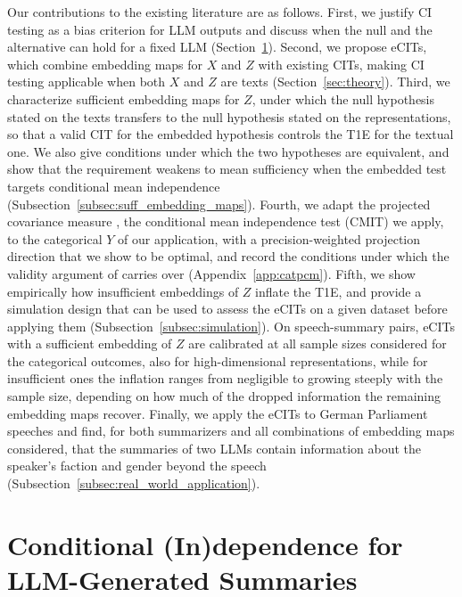 \documentclass[twoside,11pt]{article}
\begin{document}
Our contributions to the existing literature are as follows.
First, we justify CI testing as a bias criterion for LLM outputs and discuss when the null and the alternative can hold for a fixed LLM (Section~\ref{sec:motivation_llm_summaries}).
Second, we propose eCITs, which combine embedding maps for $X$ and $Z$ with existing CITs, making CI testing applicable when both $X$ and $Z$ are texts (Section~\ref{sec:theory}).
Third, we characterize sufficient embedding maps for $Z$, under which the null hypothesis stated on the texts transfers to the null hypothesis stated on the representations, so that a valid CIT for the embedded hypothesis controls the T1E for the textual one. We also give conditions under which the two hypotheses are equivalent, and show that the requirement weakens to mean sufficiency when the embedded test targets conditional mean independence (Subsection~\ref{subsec:suff_embedding_maps}).
Fourth, we adapt the projected covariance measure \citep[PCM;][]{lundborg2024projected}, the conditional mean independence test (CMIT) we apply, to the categorical $Y$ of our application, with a precision-weighted projection direction that we show to be optimal, and record the conditions under which the validity argument of \citet{lundborg2024projected} carries over (Appendix~\ref{app:catpcm}).
Fifth, we show empirically how insufficient embeddings of $Z$ inflate the T1E, and provide a simulation design that can be used to assess the eCITs on a given dataset before applying them (Subsection~\ref{subsec:simulation}).
On speech-summary pairs, eCITs with a sufficient embedding of $Z$ are calibrated at all sample sizes considered for the categorical outcomes, also for high-dimensional representations, while for insufficient ones the inflation ranges from negligible to growing steeply with the sample size, depending on how much of the dropped information the remaining embedding maps recover.
Finally, we apply the eCITs to German Parliament speeches and find, for both summarizers and all combinations of embedding maps considered, that the summaries of two LLMs contain information about the speaker's faction and gender beyond the speech (Subsection~\ref{subsec:real_world_application}).



\section{Conditional (In)dependence for LLM-Generated Summaries}\label{sec:motivation_llm_summaries}
\end{document}
